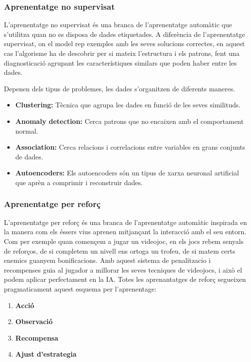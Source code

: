\subsubsection{Aprenentatge no supervisat}\label{subsubsec:Aprenentatge no supervisat}

L'aprenentatge no supervisat és una branca de l'aprenentatge automàtic que s'utilitza quan no es disposa de dades etiquetades. A diferència de l'aprenentatge supervisat, on el model rep exemples amb les seves solucions correctes, en aquest cas l'algorisme ha de descobrir per si mateix l'estructura i els patrons, fent una diagnosticació agrupant les característiques similars que poden haber entre les dades.

Depenen dels tipus de  problemes, les dades s'organitzen de diferents maneres.
\begin{itemize}
 \item \textbf{Clustering:} Tècnica que agrupa les dades en funció de les seves similituds.
 \item \textbf{Anomaly detection:} Cerca patrons que no encaixen amb el comportament normal.
 \item \textbf{Association:} Cerca relacions i correlacions entre variables en grans conjunts de dades.
 \item \textbf{Autoencoders:} Els autoencoders són un tipus de xarxa neuronal artificial que aprèn a comprimir i reconstruir dades.
\end{itemize}


\subsubsection{Aprenentatge per reforç}\label{subsubsec:Aprenentatge reforç}
L'aprenentatge per reforç és una branca de l'aprenentatge automàtic inspirada en la manera com els éssers vius aprenen mitjançant la interacció amb el seu entorn. Com per exemple quan començem a jugar un videojoc, en els jocs rebem senyals de reforços, de si completem un nivell ens ortoga un trofeu, de si matem certs enemics guanyem bonificacions. Amb aquest sistema de penalitzacio i recompenses guia al jugador a millorar les seves tecniques de videojocs, i això  el podem aplicar perfectament en la IA.
Totes les aprenantatges de reforç segueixen pragmaticament aquest esquema per l'aprenentage:
\begin{enumerate}
 \item \textbf{Acció}
 \item \textbf{Observació}
 \item \textbf{Recompensa}
 \item \textbf{Ajust d'estrategia}
\end{enumerate}


